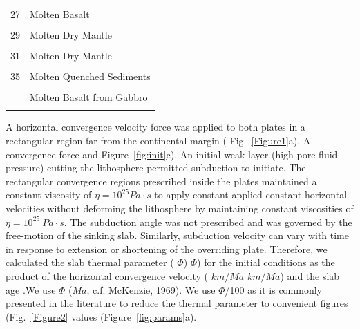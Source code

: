 \documentclass[draft,linenumbers]{agujournal2018} %
\providecommand{\DIFaddtex}[1]{{\protect\color{blue} \sf #1}} %
\providecommand{\DIFdeltex}[1]{{\protect\color{red} \scriptsize #1}} %
\providecommand{\DIFaddbegin}{} %
\providecommand{\DIFaddend}{} %
\providecommand{\DIFdelbegin}{} %
\providecommand{\DIFdelend}{} %
\providecommand{\DIFadd}[1]{\texorpdfstring{\DIFaddtex{#1}}{#1}} %
\providecommand{\DIFdel}[1]{\texorpdfstring{\DIFdeltex{#1}}{}} %
\newcommand{\DIFscaledelfig}{0.3}
\newlength{\DIFdelgraphicswidth} %
\newlength{\DIFdelgraphicsheight} %
\newcommand{\DIFaddincludegraphics}[2][]{{\color{blue}\fbox{\DIFOincludegraphics[#1]{#2}}}} %
\newcommand{\DIFdelincludegraphics}[2][]{%
\sbox{\DIFdelgraphicsbox}{\DIFOincludegraphics[#1]{#2}}%
\settoboxwidth{\DIFdelgraphicswidth}{\DIFdelgraphicsbox} %
\settoboxtotalheight{\DIFdelgraphicsheight}{\DIFdelgraphicsbox} %
\scalebox{\DIFscaledelfig}{%
\parbox[b]{\DIFdelgraphicswidth}{\usebox{\DIFdelgraphicsbox}\\[-\baselineskip] \rule{\DIFdelgraphicswidth}{0em}}\llap{\resizebox{\DIFdelgraphicswidth}{\DIFdelgraphicsheight}{%
\setlength{\unitlength}{\DIFdelgraphicswidth}%
\begin{picture}(1,1)%
\thicklines\linethickness{2pt} %
{\color[rgb]{1,0,0}\put(0,0){\framebox(1,1){}}}%
{\color[rgb]{1,0,0}\put(0,0){\line( 1,1){1}}}%
{\color[rgb]{1,0,0}\put(0,1){\line(1,-1){1}}}%
\end{picture}%
}\hspace*{3pt}}} %
} %
\DeclareRobustCommand{\DIFaddbegin}{\DIFOaddbegin \let\includegraphics\DIFaddincludegraphics} %
\DeclareRobustCommand{\DIFaddend}{\DIFOaddend \let\includegraphics\DIFOincludegraphics} %
\DeclareRobustCommand{\DIFdelbegin}{\DIFOdelbegin \let\includegraphics\DIFdelincludegraphics} %
\DeclareRobustCommand{\DIFdelend}{\DIFOaddend \let\includegraphics\DIFOincludegraphics} %
\begin{document}
\begin{table}
\begin{tabular}[t]{rl}
27 & Molten Basalt\\
\cellcolor{gray!6}{28} & \cellcolor{gray!6}{Molten Basalt}\\
29 & Molten Dry Mantle\\
\addlinespace
\cellcolor{gray!6}{30} & \cellcolor{gray!6}{Molten Dry Mantle}\\
31 & Molten Dry Mantle\\
\cellcolor{gray!6}{34} & \cellcolor{gray!6}{Molten Hydrated Mantle}\\
35 & Molten Quenched Sediments\\
\cellcolor{gray!6}{36} & \cellcolor{gray!6}{Molten Basalt from Basalt}\\
\addlinespace
37 & Molten Basalt from Gabbro\\
\cellcolor{gray!6}{38} & \cellcolor{gray!6}{Molten Basalt from Mantle}\\
\bottomrule
\end{tabular}
\end{table}
\DIFaddend

A horizontal convergence \DIFdelbegin \DIFdel{velocity }\DIFdelend \DIFaddbegin \DIFadd{force }\DIFaddend was applied to both plates in a
rectangular region far from the continental margin
(\DIFdelbegin \DIFdel{Fig.~\ref{Figure1}a). A convergence force and }\DIFdelend \DIFaddbegin \DIFadd{Figure~\ref{fig:init}c). An }\DIFaddend initial weak layer \DIFdelbegin \DIFdel{(high pore fluid pressure) }\DIFdelend cutting the lithosphere
permitted subduction to initiate. The rectangular convergence regions
prescribed inside the plates \DIFdelbegin \DIFdel{maintained a constant viscosity of $\eta = 10^25 Pa\cdot s$ to apply constant }\DIFdelend \DIFaddbegin \DIFadd{applied constant }\DIFaddend horizontal velocities
without deforming the lithosphere \DIFaddbegin \DIFadd{by maintaining constant viscosities of
\(\eta = 10^{25}~Pa\cdot s\)}\DIFaddend . The subduction angle was not prescribed
and was governed by the free-motion of the sinking slab. Similarly,
subduction velocity can vary with time in response to extension or
shortening of the overriding plate. Therefore, we calculated the slab
thermal parameter (\DIFdelbegin \DIFdel{$\Phi$) }\DIFdelend \DIFaddbegin \DIFadd{\(\Phi\)) for the initial conditions }\DIFaddend as the product
of the horizontal convergence velocity (\DIFdelbegin \DIFdel{$km/Ma$}\DIFdelend \DIFaddbegin \DIFadd{\(km/Ma\)}\DIFaddend ) and the slab age
\DIFdelbegin %
\DIFdel{.We use $\Phi$}\DIFdelend \DIFaddbegin \DIFadd{(\(Ma\), c.f. McKenzie, 1969). We use \(\Phi\)}\DIFaddend /100 as it is commonly
presented in the literature to reduce the thermal parameter to
convenient \DIFdelbegin \DIFdel{figures (Fig.~\ref{Figure2}}\DIFdelend \DIFaddbegin \DIFadd{values (Figure~\ref{fig:params}}\DIFaddend a).
\end{document}
